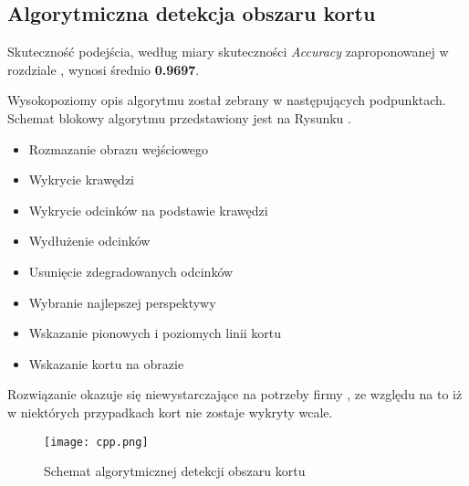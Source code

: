 \subsection{Algorytmiczna detekcja obszaru kortu}

Skuteczność podejścia, według miary skuteczności \textit{Accuracy} zaproponowanej w rozdziale , wynosi średnio \textbf{0.9697}.

Wysokopoziomy opis algorytmu został zebrany w następujących podpunktach. Schemat blokowy algorytmu przedstawiony jest na Rysunku .

\begin{itemize}
  \item Rozmazanie obrazu wejściowego
  \item Wykrycie krawędzi
  \item Wykrycie odcinków na podstawie krawędzi
  \item Wydłużenie odcinków
  \item Usunięcie zdegradowanych odcinków
  \item Wybranie najlepszej perspektywy
  \item Wskazanie pionowych i poziomych linii kortu
  \item Wskazanie kortu na obrazie
\end{itemize}

Rozwiązanie okazuje się niewystarczające na potrzeby firmy \blue, ze względu na to iż w niektórych przypadkach kort nie zostaje wykryty wcale.

\begin{figure}[h]
  \centering
  \caption{Schemat algorytmicznej detekcji obszaru kortu}
  \texttt{[image: cpp.png]}
  \label{fig:algcpp}
\end{figure}
